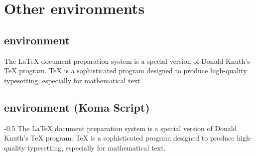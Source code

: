 %

%
\section{Other environments}
\subsection{ environment}

\begin{filecontents*}{\democodefile}
\begin{abstract}
\LaTeX{} is a document markup language and document preparation 
system for the \TeX{} typesetting program.
\end{abstract}
The \LaTeX{} document preparation system is a special version of Donald
Knuth's \TeX{} program. \TeX{} is a sophisticated program designed to 
produce high-quality typesetting, especially for mathematical text.
\end{filecontents*}

%

\subsection{ environment (Koma Script)}
\label{sec:EnvAddmargin}

\begin{filecontents*}{\democodefile}
\begin{addmargin}[0cm]{-0.5\marginwidth}
The \LaTeX{} document preparation system is a special version of Donald
Knuth's \TeX{} program. \TeX{} is a sophisticated program designed to 
produce high-quality typesetting, especially for mathematical text.
\end{addmargin}
\end{filecontents*}

%



